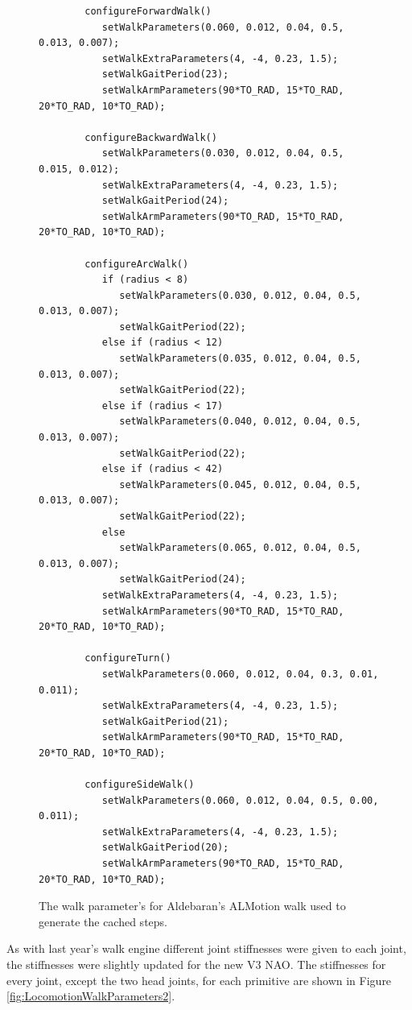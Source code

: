 \begin{figure}
	\begin{center}
		{\scriptsize\begin{verbatim}
		configureForwardWalk()
		   setWalkParameters(0.060, 0.012, 0.04, 0.5, 0.013, 0.007);
		   setWalkExtraParameters(4, -4, 0.23, 1.5);
		   setWalkGaitPeriod(23);
		   setWalkArmParameters(90*TO_RAD, 15*TO_RAD, 20*TO_RAD, 10*TO_RAD);

		configureBackwardWalk()
		   setWalkParameters(0.030, 0.012, 0.04, 0.5, 0.015, 0.012);
		   setWalkExtraParameters(4, -4, 0.23, 1.5);
		   setWalkGaitPeriod(24);
		   setWalkArmParameters(90*TO_RAD, 15*TO_RAD, 20*TO_RAD, 10*TO_RAD);

		configureArcWalk()
		   if (radius < 8)
		      setWalkParameters(0.030, 0.012, 0.04, 0.5, 0.013, 0.007);
		      setWalkGaitPeriod(22);
		   else if (radius < 12)
		      setWalkParameters(0.035, 0.012, 0.04, 0.5, 0.013, 0.007);
		      setWalkGaitPeriod(22);
		   else if (radius < 17)
		      setWalkParameters(0.040, 0.012, 0.04, 0.5, 0.013, 0.007);
		      setWalkGaitPeriod(22);
		   else if (radius < 42)
		      setWalkParameters(0.045, 0.012, 0.04, 0.5, 0.013, 0.007);
		      setWalkGaitPeriod(22);
		   else
		      setWalkParameters(0.065, 0.012, 0.04, 0.5, 0.013, 0.007);
		      setWalkGaitPeriod(24);
		   setWalkExtraParameters(4, -4, 0.23, 1.5);
		   setWalkArmParameters(90*TO_RAD, 15*TO_RAD, 20*TO_RAD, 10*TO_RAD);

		configureTurn()
		   setWalkParameters(0.060, 0.012, 0.04, 0.3, 0.01, 0.011);
		   setWalkExtraParameters(4, -4, 0.23, 1.5);
		   setWalkGaitPeriod(21);
		   setWalkArmParameters(90*TO_RAD, 15*TO_RAD, 20*TO_RAD, 10*TO_RAD);

		configureSideWalk()
		   setWalkParameters(0.060, 0.012, 0.04, 0.5, 0.00, 0.011);
		   setWalkExtraParameters(4, -4, 0.23, 1.5);
		   setWalkGaitPeriod(20);
		   setWalkArmParameters(90*TO_RAD, 15*TO_RAD, 20*TO_RAD, 10*TO_RAD);
		\end{verbatim}}
		\caption{The walk parameter's for Aldebaran's ALMotion walk used to generate the cached steps.}
		\label{fig:LocomotionWalkParameters}
	\end{center}
\end{figure}

As with last year's walk engine \cite{JasonsAcraPaper} different joint stiffnesses were given to each joint, the stiffnesses were slightly updated for the new V3 NAO. The stiffnesses for every joint, except the two head joints, for each primitive are shown in Figure \ref{fig:LocomotionWalkParameters2}.

